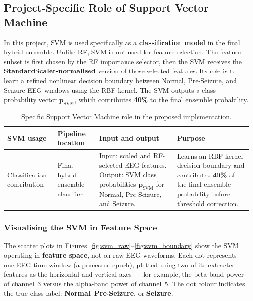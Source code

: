 \documentclass[12pt, a4paper]{report}
\begin{document}
\subsection{Project-Specific Role of Support Vector Machine}
\label{sec:svm_project_role}

In this project, SVM is used specifically as a \textbf{classification model}
in the final hybrid ensemble. Unlike RF, SVM is not used for feature
selection. The feature subset is first chosen by the RF importance selector,
then the SVM receives the \textbf{StandardScaler-normalised} version of
those selected features. Its role is to learn a refined nonlinear decision
boundary between Normal, Pre-Seizure, and Seizure EEG windows using the RBF
kernel. The SVM outputs a class-probability vector
$\mathbf{p}_{\text{SVM}}$, which contributes \textbf{40\%} to the final
ensemble probability.

\begin{table}[H]
  \centering
  \caption{Specific Support Vector Machine role in the proposed implementation.}
  \label{tab:svm_role}
  \footnotesize
  \setlength{\tabcolsep}{3pt}
  \renewcommand{\arraystretch}{1.2}
  \begin{tabularx}{\textwidth}{>{\raggedright\arraybackslash}p{2.5cm}
                              >{\raggedright\arraybackslash}p{3.1cm}
                              >{\raggedright\arraybackslash}X
                              >{\raggedright\arraybackslash}X}
    \toprule
    \textbf{SVM usage} & \textbf{Pipeline location} & \textbf{Input and output} & \textbf{Purpose} \\
    \midrule
    Classification contribution &
    Final hybrid ensemble classifier &
    Input: scaled and RF-selected EEG features. Output: SVM class probabilities
    $\mathbf{p}_{\text{SVM}}$ for Normal, Pre-Seizure, and Seizure. &
    Learns an RBF-kernel decision boundary and contributes \textbf{40\%}
    of the final ensemble probability before threshold correction. \\
    \bottomrule
  \end{tabularx}
\end{table}

\subsubsection*{Visualising the SVM in Feature Space}

The scatter plots in Figures~\ref{fig:svm_raw}--\ref{fig:svm_boundary} show the
SVM operating in \textbf{feature space}, not on raw EEG waveforms. Each dot represents
one EEG time window (a processed epoch), plotted using two of its extracted features
as the horizontal and vertical axes --- for example, the beta-band power of channel~3
versus the alpha-band power of channel~5. The dot colour indicates the true class label:
\textcolor[HTML]{006633}{\textbf{Normal}},
\textcolor[HTML]{996600}{\textbf{Pre-Seizure}}, or
\textcolor[HTML]{CC1111}{\textbf{Seizure}}.
\end{document}
